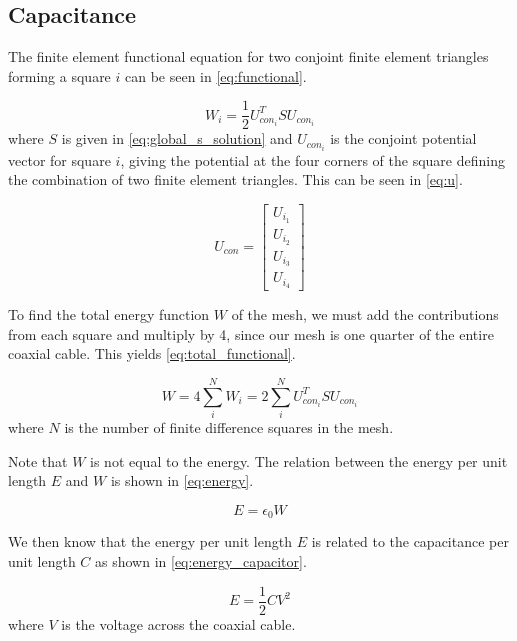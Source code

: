 \documentclass[a4paper,titlepage]{article}
\begin{document}
	\subsection{Capacitance}
	
	The finite element functional equation for two conjoint finite element triangles forming a square $i$ can be seen in \cref{eq:functional}.
	
	\begin{equation} \label{eq:functional}
		W_i = \frac{1}{2} U_{con_i}^T S U_{con_i}
	\end{equation}
	where $S$ is given in \cref{eq:global_s_solution} and $U_{con_i}$ is the conjoint potential vector for square $i$, giving the potential at the four corners of the square defining the combination of two finite element triangles. This can be seen in \cref{eq:u}.
	
	\begin{equation} \label{eq:u}
		U_{con} = 
			\begin{bmatrix}
				U_{i_1} \\
				U_{i_2} \\
				U_{i_3} \\
				U_{i_4}
			\end{bmatrix}
	\end{equation}
	
	To find the total energy function $W$ of the mesh, we must add the contributions from each square and multiply by 4, since our mesh is one quarter of the entire coaxial cable. This yields \cref{eq:total_functional}.
	
	\begin{equation} \label{eq:total_functional}
		W = 4 \sum_{i}^{N}{W_i} = 2 \sum_{i}^{N}{U_{con_i}^T S U_{con_i}}
	\end{equation} 
	where $N$ is the number of finite difference squares in the mesh.
	
	Note that $W$ is not equal to the energy. The relation between the energy per unit length $E$ and $W$ is shown in \cref{eq:energy}.
	
	\begin{equation} \label{eq:energy}
		E = \epsilon_0 W
	\end{equation}
	
	We then know that the energy per unit length $E$ is related to the capacitance per unit length $C$ as shown in \cref{eq:energy_capacitor}.
	
	\begin{equation} \label{eq:energy_capacitor}
		E = \frac{1}{2} C V^2
	\end{equation}
	where $V$ is the voltage across the coaxial cable.
	
\end{document}
